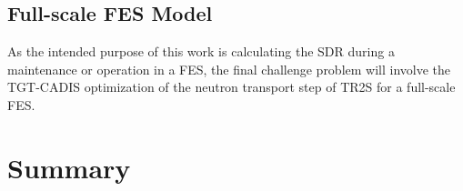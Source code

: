 


\subsection{Full-scale FES Model} \label{sec:full_scale}
As the intended purpose of this work is  
calculating the SDR during a maintenance or
operation in a FES, the final challenge problem will involve the
TGT-CADIS optimization of the neutron transport step of TR2S for a full-scale
FES.



\section{Summary}\label{sec:summary}

